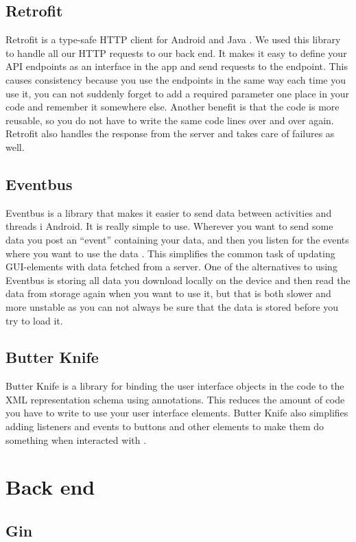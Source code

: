 \documentclass[../Main/thesis.tex]{subfiles}
\begin{document}
\subsection{Retrofit}
Retrofit is a type-safe HTTP client for Android and Java \citep{SquareInc.2017}.
We used this library to handle all our HTTP requests to our back end. 
It makes it easy to define your API endpoints as an interface in the app and send requests to the endpoint.
This causes consistency because you use the endpoints in the same way each time you use it, you can not suddenly forget to add a required parameter one place in your code and remember it somewhere else.
Another benefit is that the code is more reusable, so you do not have to write the same code lines over and over again.
Retrofit also handles the response from the server and takes care of failures as well.

\subsection{Eventbus}
Eventbus is a library that makes it easier to send data between activities and threads i Android. 
It is really simple to use.
Wherever you want to send some data you post an ``event'' containing your data, and then you listen for the events where you want to use the data \citep{Greenrobot2016}.
This simplifies the common task of updating GUI-elements with data fetched from a server.
One of the alternatives to using Eventbus is storing all data you download locally on the device and then read the data from storage again when you want to use it, but that is both slower and more unstable as you can not always be sure that the data is stored before you try to load it. 

\subsection{Butter Knife}
Butter Knife is a library for binding the user interface objects in the code to the XML representation schema using annotations.
This reduces the amount of code you have to write to use your user interface elements. 
Butter Knife also simplifies adding listeners and events to buttons and other elements to make them do something when interacted with \citep{Wharton2018}.

\section{Back end}
\subsection{Gin}
\end{document}
